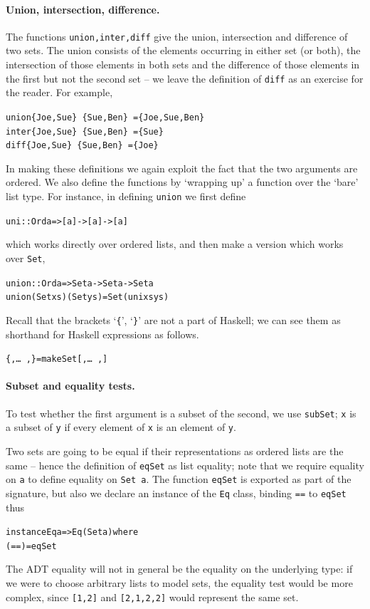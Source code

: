 \paragraph{Union, intersection, difference.}
The functions \texttt{union,inter,diff} give the union, intersection and difference of two
sets. The union consists of the elements occurring in either set (or both), the
intersection of those elements in both sets and the difference of those
elements in the first but not the second set -- we leave the definition of \texttt{diff}
as an exercise for the reader. For example,
\begin{alltt}
union \{Joe,Sue\}\ \{Sue,Ben\}\ =  \{Joe,Sue,Ben\}
inter \{Joe,Sue\}\ \{Sue,Ben\}\ =  \{Sue\}
diff  \{Joe,Sue\}\ \{Sue,Ben\}\ =  \{Joe\}
\end{alltt}
In making these definitions we again exploit the fact that the two arguments
are ordered. We also define the functions by `wrapping up' a function
over the `bare' list type. For instance, in defining \texttt{union} we first
define
\begin{alltt}
uni :: Ord a => [a] -> [a] -> [a]
\end{alltt}
which works directly over ordered lists, and then make a version
which works over \texttt{Set},
\begin{alltt}
union :: Ord a => Set a -> Set a -> Set a
union (Set xs) (Set ys) = Set (uni xs ys)
\end{alltt}
Recall that the brackets  `\texttt{\{}', `\texttt{\}}' are not a part of Haskell; 
we can see them as shorthand for Haskell expressions as follows.
\begin{alltt}
\{\eone, \ldots\ ,\} = makeSet [\eone, \ldots\ ,]
\end{alltt}

\paragraph{Subset and equality tests.}
To test whether the first argument is a subset of the second, we use 
\texttt{subSet}; \texttt{x} is a subset of \texttt{y} if every element of \texttt{x} is an
element of \texttt{y}.

Two sets are going to be equal if their representations as ordered lists are
the same -- hence the definition of \texttt{eqSet} as list equality; note that
we require equality on \texttt{a} to define equality on \texttt{Set a}.
The function \texttt{eqSet} is exported as part of the signature, but
also we declare an instance of the \texttt{Eq} class, binding \texttt{==} to \texttt{eqSet}
thus
\begin{alltt}
instance Eq a => Eq (Set a) where\minx{==}
  (==) = eqSet
\end{alltt}
The ADT equality will not in general
be the equality on the underlying type:
if we were to choose arbitrary lists to
model sets, the equality test would be more complex, since \texttt{[1,2]} and
\texttt{[2,1,2,2]} would represent the same set.


